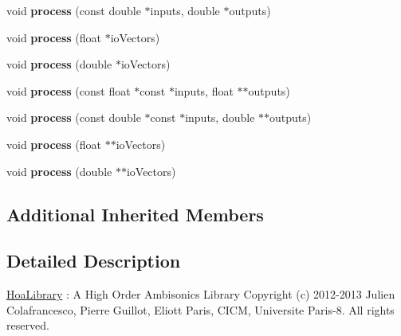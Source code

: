 \begin{DoxyCompactItemize}
\item 
\hypertarget{class_ambisonic_freeverb_a3bf00717d5692d2ef26cfa0e83001b63}{void {\bfseries process} (const double $\ast$inputs, double $\ast$outputs)}\label{class_ambisonic_freeverb_a3bf00717d5692d2ef26cfa0e83001b63}

\item 
\hypertarget{class_ambisonic_freeverb_a2f9bf07f2091071471f2f6803fd31fcb}{void {\bfseries process} (float $\ast$io\-Vectors)}\label{class_ambisonic_freeverb_a2f9bf07f2091071471f2f6803fd31fcb}

\item 
\hypertarget{class_ambisonic_freeverb_a0b1c001c27810780b802a34fe9fd206c}{void {\bfseries process} (double $\ast$io\-Vectors)}\label{class_ambisonic_freeverb_a0b1c001c27810780b802a34fe9fd206c}

\item 
\hypertarget{class_ambisonic_freeverb_acc58d029bd3c3b55cf9a13e2c164fae8}{void {\bfseries process} (const float $\ast$const $\ast$inputs, float $\ast$$\ast$outputs)}\label{class_ambisonic_freeverb_acc58d029bd3c3b55cf9a13e2c164fae8}

\item 
\hypertarget{class_ambisonic_freeverb_ae31f0e933fe2c4c7ab5982a83481a2d3}{void {\bfseries process} (const double $\ast$const $\ast$inputs, double $\ast$$\ast$outputs)}\label{class_ambisonic_freeverb_ae31f0e933fe2c4c7ab5982a83481a2d3}

\item 
\hypertarget{class_ambisonic_freeverb_af73fe573fd3a25e279ab14feb95070c7}{void {\bfseries process} (float $\ast$$\ast$io\-Vectors)}\label{class_ambisonic_freeverb_af73fe573fd3a25e279ab14feb95070c7}

\item 
\hypertarget{class_ambisonic_freeverb_a9e90790840fb793f779a3f2d985fbdfa}{void {\bfseries process} (double $\ast$$\ast$io\-Vectors)}\label{class_ambisonic_freeverb_a9e90790840fb793f779a3f2d985fbdfa}

\end{DoxyCompactItemize}
\subsection*{Additional Inherited Members}


\subsection{Detailed Description}
\hyperlink{interface_hoa_library}{Hoa\-Library} \-: A High Order Ambisonics Library Copyright (c) 2012-\/2013 Julien Colafrancesco, Pierre Guillot, Eliott Paris, C\-I\-C\-M, Universite Paris-\/8. All rights reserved.

